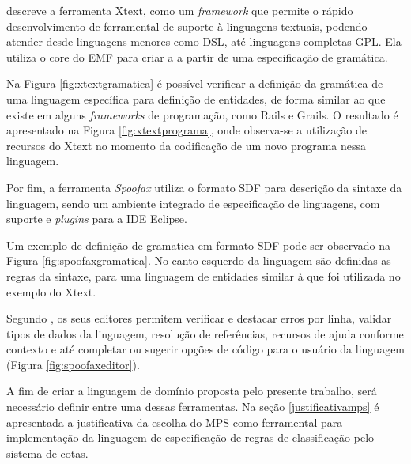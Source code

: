  descreve a ferramenta Xtext, como um \textit{framework} que permite o rápido desenvolvimento de ferramental de suporte à linguagens textuais, podendo atender desde linguagens menores como \gls{DSL}, até linguagens completas \gls{GPL}. Ela utiliza o core do \gls{EMF} para criar a  a partir de uma especificação de gramática. 

Na Figura \ref{fig:xtextgramatica} é possível verificar a definição da gramática de uma linguagem específica para definição de entidades, de forma similar ao que existe em alguns \textit{frameworks} de programação, como Rails e Grails. O resultado é apresentado na Figura \ref{fig:xtextprograma}, onde observa-se a utilização de recursos do Xtext no momento da codificação de um novo programa nessa linguagem.





\newpage
Por fim, a ferramenta \textit{Spoofax} utiliza o formato \gls{SDF} para descrição da sintaxe da linguagem, sendo um ambiente integrado de especificação de linguagens, com suporte e \textit{plugins} para a \gls{IDE} Eclipse. 

Um exemplo de definição de gramatica em formato \gls{SDF} pode ser observado na Figura \ref{fig:spoofaxgramatica}. No canto esquerdo da linguagem são definidas as regras da sintaxe, para uma linguagem de entidades similar à que foi utilizada no exemplo do Xtext. 




Segundo , os seus editores permitem verificar e destacar erros por linha, validar tipos de dados da linguagem, resolução de referências, recursos de ajuda conforme contexto e até completar ou sugerir opções de código para o usuário da linguagem (Figura \ref{fig:spoofaxeditor}). 



A fim de criar a linguagem de domínio proposta pelo presente trabalho, será necessário definir entre uma dessas ferramentas. Na seção \ref{justificativamps} é apresentada a justificativa da escolha do \gls{MPS} como ferramental para implementação da linguagem de especificação de regras de classificação pelo sistema de cotas.